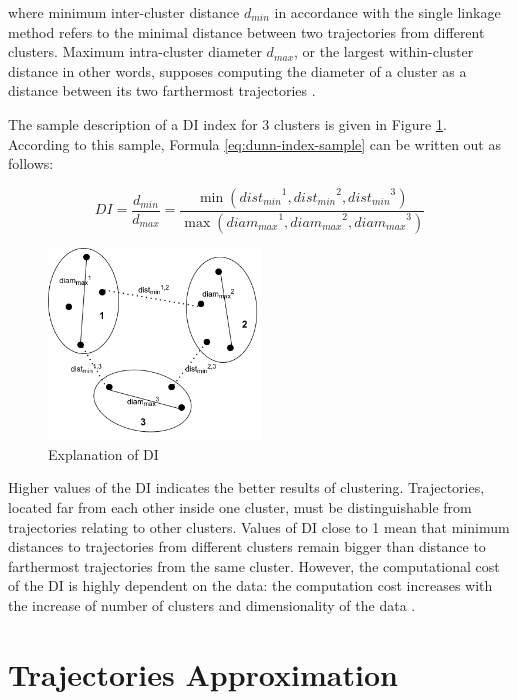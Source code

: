 where minimum inter-cluster distance $d_{min}$ in accordance with the single linkage method refers to the minimal distance between two trajectories from different clusters. Maximum intra-cluster diameter $d_{max}$, or the largest within-cluster distance in other words, supposes computing the diameter of a cluster as a distance between its two farthermost trajectories \cite{inproceedings:clust_ind}. 

The sample description of a DI index for 3 clusters is given in Figure \ref{fig:di_sample}. According to this sample, Formula \ref{eq:dunn-index-sample} can be written out as follows:

\begin{equation} \label{eq:dunn-index-sample}
DI = \frac {d_{min}} {d_{max}} = \frac
	{\min ({dist_{min}}^1, {dist_{min}}^2, {dist_{min}}^3)}
	{\max ({diam_{max}}^1, {diam_{max}}^2, {diam_{max}}^3)}
\end{equation}

\begin{figure}[!htb]
	\centering{}
	\includegraphics[width=0.5\textwidth]{images/di-sample.png}
	\caption{Explanation of DI}
	\label{fig:di_sample}
\end{figure}

Higher values of the DI indicates the better results of clustering. Trajectories, located far from each other inside one cluster, must be distinguishable from trajectories relating to other clusters. Values of DI close to 1 mean that minimum distances to trajectories from different clusters remain bigger than distance to farthermost trajectories from the same cluster. However, the computational cost of the DI is highly dependent on the data: the computation cost increases with the increase of number of clusters and dimensionality of the data \cite{online:dunn_cl_valid}.


\section{Trajectories Approximation}

